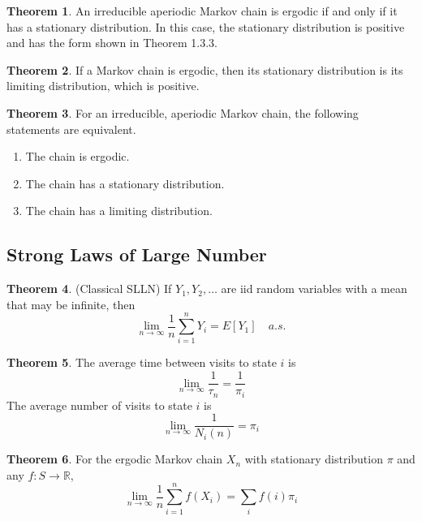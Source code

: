 \documentclass[twoside]{article}
\theoremstyle{definition}
\newtheorem{theorem}{Theorem}[section]
\theoremstyle{remark}
\theoremstyle{remark}
\begin{document}
\begin{theorem}
  An irreducible aperiodic Markov chain is ergodic if and only if it
  has a stationary distribution. In this case, the stationary
  distribution is positive and has the form shown in Theorem 1.3.3.
\end{theorem}

\begin{theorem}
  If a Markov chain is ergodic, then its stationary distribution is its
  limiting distribution, which is positive.
\end{theorem}

\begin{theorem}
  For an irreducible, aperiodic Markov chain, the following statements
  are equivalent.
  \begin{enumerate}
    \item The chain is ergodic.
    \item The chain has a stationary distribution.
    \item The chain has a limiting distribution.
  \end{enumerate}
\end{theorem}

\subsection{Strong Laws of Large Number}

\begin{theorem}
  (Classical SLLN) If $Y_1, Y_2, \ldots$ are iid random variables with a mean
  that may be infinite, then
  \begin{equation}
    \lim_{n\rightarrow\infty} \frac{1}{n}\sum_{i=1}^{n}Y_i = E[Y_1] \quad a.s.
  \end{equation}
\end{theorem}

\begin{theorem}
  The average time between visits to state $i$ is
  \begin{equation}
    \lim_{n\rightarrow\infty} \frac{1}{\tau_n} = \frac{1}{\pi_i}
  \end{equation}
  The average number of visits to state $i$ is
  \begin{equation}
    \lim_{n\rightarrow\infty} \frac{1}{N_i(n)} = \pi_i
  \end{equation}
\end{theorem}

\begin{theorem}
  For the ergodic Markov chain $X_n$ with stationary distribution $\pi$ and
  any $f: S \rightarrow \mathbb{R}$,
  \begin{equation}
    \lim_{n\rightarrow\infty} \frac{1}{n}\sum_{i=1}^{n} f(X_i) = \sum_i f(i) \pi_i
  \end{equation}
\end{theorem}
\end{document}
